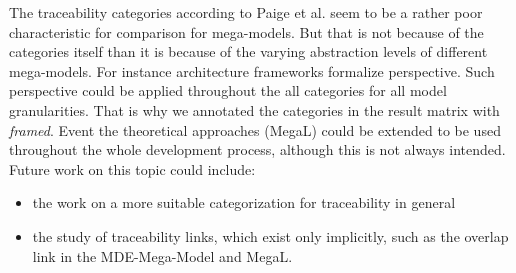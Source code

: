 \documentclass[runningheads,a4paper]{llncs}
\begin{document}
The traceability categories according to Paige et al. seem to be a rather poor characteristic for comparison for mega-models.
But that is  not because of the categories itself than it is because of the varying abstraction levels of different mega-models.
For instance architecture frameworks formalize perspective.
Such perspective could be applied throughout the all categories for all model granularities.
That is why we annotated the categories in the result matrix with \textit{framed}.
Event the theoretical approaches (MegaL) could be extended to be used throughout the whole development process, although this is not always intended.
\newline
\newline
Future work on this topic could include:
\begin{itemize}

\item
the work on a more suitable categorization for traceability in general

\item
the study of traceability links, which exist only implicitly, such as the overlap link in the MDE-Mega-Model and MegaL.

\end{itemize}


\end{document}
